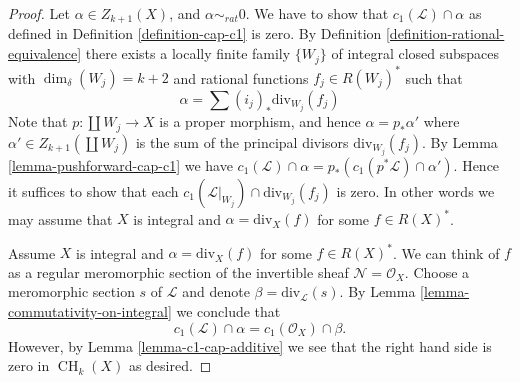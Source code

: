 \documentclass[10pt,a4paper]{amsart}
\theoremstyle{plain}
\theoremstyle{definition}
\theoremstyle{remark}
\numberwithin{equation}{subsection}
\def\CH{\mathop{\mathrm{CH}}\nolimits}
\begin{document}
\begin{proof}
Let $\alpha \in Z_{k + 1}(X)$, and $\alpha \sim_{rat} 0$.
We have to show that $c_1(\mathcal{L}) \cap \alpha$
as defined in Definition \ref{definition-cap-c1} is zero.
By Definition \ref{definition-rational-equivalence} there
exists a locally finite family $\{W_j\}$ of integral closed
subspaces with $\dim_\delta(W_j) = k + 2$ and rational functions
$f_j \in R(W_j)^*$ such that
$$
\alpha = \sum (i_j)_*\text{div}_{W_j}(f_j)
$$
Note that $p : \coprod W_j \to X$ is a proper morphism,
and hence $\alpha = p_*\alpha'$ where $\alpha' \in Z_{k + 1}(\coprod W_j)$
is the sum of the principal divisors $\text{div}_{W_j}(f_j)$.
By Lemma \ref{lemma-pushforward-cap-c1} we have
$c_1(\mathcal{L}) \cap \alpha = p_*(c_1(p^*\mathcal{L}) \cap \alpha')$.
Hence it suffices to show that each
$c_1(\mathcal{L}|_{W_j}) \cap \text{div}_{W_j}(f_j)$ is zero.
In other words we may assume that $X$ is integral and
$\alpha = \text{div}_X(f)$ for some $f \in R(X)^*$.

\medskip\noindent
Assume $X$ is integral and $\alpha = \text{div}_X(f)$ for some $f \in R(X)^*$.
We can think of $f$ as a regular meromorphic section of the invertible
sheaf $\mathcal{N} = \mathcal{O}_X$. Choose a meromorphic section
$s$ of $\mathcal{L}$ and denote $\beta = \text{div}_\mathcal{L}(s)$.
By Lemma \ref{lemma-commutativity-on-integral}
we conclude that
$$
c_1(\mathcal{L}) \cap \alpha = c_1(\mathcal{O}_X) \cap \beta.
$$
However, by Lemma \ref{lemma-c1-cap-additive} we see that the right hand side
is zero in $\CH_k(X)$ as desired.
\end{proof}
\end{document}
